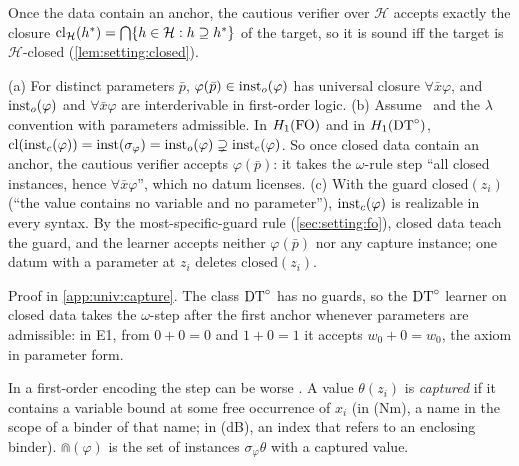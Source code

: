 Once the data contain an anchor, the cautious verifier over $\mathcal H$ accepts exactly the closure $\mathrm{cl}_{\mathcal H}(h^*)=\bigcap\{h\in\mathcal H:h\supseteq h^*\}$ of the target, so it is sound iff the target is $\mathcal H$-closed (\cref{lem:setting:closed}).

\begin{proposition}\label{prop:univ:open}
\textup{(a)} For distinct parameters $\bar p$, $\varphi(\bar p)\in\mathrm{inst}_{o}(\varphi)$ has universal closure $\forall\bar x\varphi$, and $\mathrm{inst}_{o}(\varphi)$ and $\forall\bar x\varphi$ are interderivable in first-order logic.
\textup{(b)} Assume \univRich\ and the $\lambda$ convention with parameters admissible. In $H_{1}(\mathrm{FO})$ and in $H_{1}(\mathrm{DT}^{\circ})$, $\mathrm{cl}(\mathrm{inst}_{c}(\varphi))=\mathrm{inst}(\sigma_\varphi)=\mathrm{inst}_{o}(\varphi)\supsetneq\mathrm{inst}_{c}(\varphi)$. So once closed data contain an anchor, the cautious verifier accepts $\varphi(\bar p)$: it takes the $\omega$-rule step ``all closed instances, hence $\forall\bar x\varphi$'', which no datum licenses.
\textup{(c)} With the guard $\mathrm{closed}(z_i)$ (``the value contains no variable and no parameter''), $\mathrm{inst}_{c}(\varphi)$ is realizable in every syntax. By the most-specific-guard rule (\cref{sec:setting:fo}), closed data teach the guard, and the learner accepts neither $\varphi(\bar p)$ nor any capture instance; one datum with a parameter at $z_i$ deletes $\mathrm{closed}(z_i)$.
\end{proposition}

\noindent Proof in \cref{app:univ:capture}. The class $\mathrm{DT}^{\circ}$ has no guards, so the $\mathrm{DT}^{\circ}$ learner on closed data takes the $\omega$-step after the first anchor whenever parameters are admissible: in E1, from $0+0=0$ and $1+0=1$ it accepts $w_0+0=w_0$, the axiom in parameter form.

In a first-order encoding the step can be worse . A value $\theta(z_i)$ is \emph{captured} if it contains a variable bound at some free occurrence of $x_i$ (in (Nm), a name in the scope of a binder of that name; in (dB), an index that refers to an enclosing binder). $\Cap(\varphi)$ is the set of instances $\sigma_\varphi\theta$ with a captured value.

